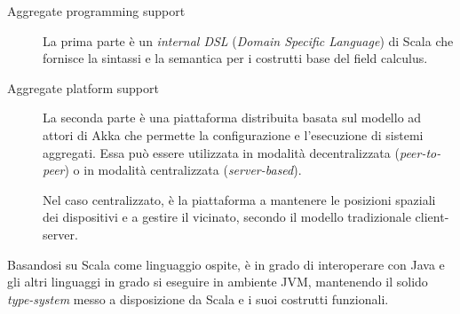 \begin{description}
  \item[Aggregate programming support]
    La prima parte è un \emph{internal DSL} (\emph{Domain Specific Language}) di Scala che fornisce la sintassi e la semantica per i costrutti base del field calculus.

  \item[Aggregate platform support]
    La seconda parte è una piattaforma distribuita basata sul modello ad attori di Akka che permette la configurazione e l'esecuzione di sistemi aggregati.
    Essa può essere utilizzata in modalità decentralizzata (\emph{peer-to-peer}) %
    o in modalità centralizzata (\emph{server-based}).%



    Nel caso centralizzato, è la piattaforma a mantenere le posizioni spaziali dei dispositivi e a gestire il vicinato, secondo il modello tradizionale client-server.
\end{description}

Basandosi su Scala come linguaggio ospite, è in grado di interoperare con Java e gli altri linguaggi in grado si eseguire in ambiente JVM, mantenendo il solido \emph{type-system} messo a disposizione da Scala e i suoi costrutti funzionali.

